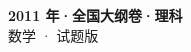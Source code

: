 \documentclass[zihao=-4, a4paper]{ctexart}
\begin{document}
\begin{center}
  {\Large\bfseries 2011 年·全国大纲卷·理科}\\[4pt]
  {\large 数学 · 试题版}
\end{center}
\medskip
{}

\end{document}
